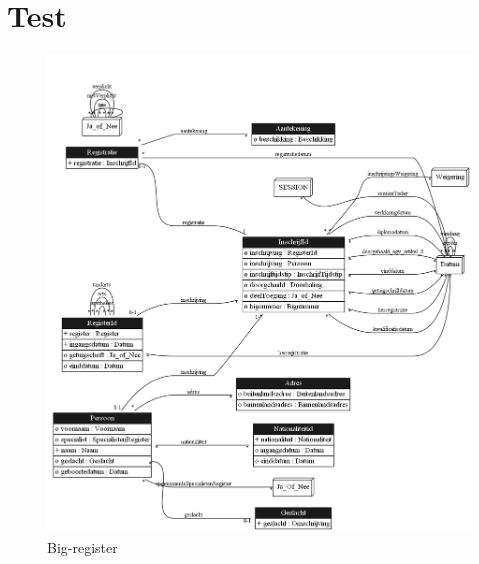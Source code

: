 \section{Test} \label{test}

\begin{figure} 
    \includegraphics[scale=0.13]
        {../../images/LogicalDataModel.png}
    \caption{Big-register}
    \label{fig:Big-register}
\end{figure}

